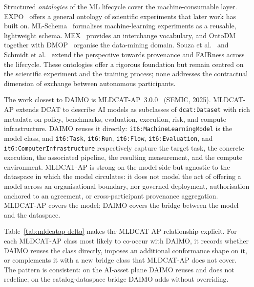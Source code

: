 \documentclass[Afour,sagev,times]{sagej}
\newcommand{\code}[1]{\texttt{#1}}
\begin{document}
Structured \emph{ontologies} of the ML lifecycle cover the machine-consumable layer. EXPO~\cite{expo} offers a general ontology of scientific experiments that later work has built on. ML-Schema~\cite{mls} formalises machine-learning experiments as a reusable, lightweight schema. MEX~\cite{mex} provides an interchange vocabulary, and OntoDM~\cite{ontodm} together with DMOP~\cite{dmop} organise the data-mining domain. Souza et al.~\cite{souza19} and Schmidt et al.~\cite{schmidt21} extend the perspective towards provenance and FAIRness across the lifecycle. These ontologies offer a rigorous foundation but remain centred on the scientific experiment and the training process; none addresses the contractual dimension of exchange between autonomous participants.

The work closest to DAIMO is MLDCAT-AP~3.0.0~\cite{mldcatap} (SEMIC, 2025). MLDCAT-AP extends DCAT to describe AI models as subclasses of \code{dcat:Dataset} with rich metadata on policy, benchmarks, evaluation, execution, risk, and compute infrastructure. DAIMO reuses it directly: \code{it6:MachineLearningModel} is the model class, and \code{it6:Task}, \code{it6:Run}, \code{it6:Flow}, \code{it6:Evaluation}, and \code{it6:ComputerInfrastructure} respectively capture the target task, the concrete execution, the associated pipeline, the resulting measurement, and the compute environment. MLDCAT-AP is strong on the model side but agnostic to the dataspace in which the model circulates: it does not model the act of offering a model across an organisational boundary, nor governed deployment, authorisation anchored to an agreement, or cross-participant provenance aggregation. MLDCAT-AP covers the model; DAIMO covers the bridge between the model and the dataspace.

Table~\ref{tab:mldcatap-delta} makes the MLDCAT-AP relationship explicit. For each MLDCAT-AP class most likely to co-occur with DAIMO, it records whether DAIMO reuses the class directly, imposes an additional conformance shape on it, or complements it with a new bridge class that MLDCAT-AP does not cover. The pattern is consistent: on the AI-asset plane DAIMO reuses and does not redefine; on the catalog-dataspace bridge DAIMO adds without overriding.
\end{document}
